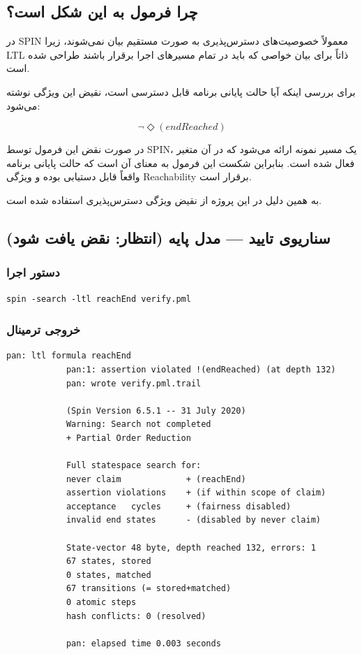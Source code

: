 \documentclass[12pt]{report}
\begin{document}
	\subsection{چرا فرمول به این شکل است؟}
	
	در SPIN معمولاً خصوصیت‌های دسترس‌پذیری به صورت مستقیم بیان نمی‌شوند، زیرا LTL ذاتاً برای بیان خواصی که باید در تمام مسیرهای اجرا برقرار باشند طراحی شده است.
	
	برای بررسی اینکه آیا حالت پایانی برنامه قابل دسترسی است، نقیض این ویژگی نوشته می‌شود:
	
	\[
	\neg\Diamond(\mathit{endReached})
	\]
	
	در صورت نقض این فرمول توسط SPIN، یک مسیر نمونه ارائه می‌شود که در آن متغیر
	فعال شده است. بنابراین شکست این فرمول به معنای آن است که حالت پایانی برنامه واقعاً قابل دستیابی بوده و ویژگی Reachability برقرار است.
	
	به همین دلیل در این پروژه از نقیض ویژگی دسترس‌پذیری استفاده شده است.
	
	\subsection{سناریوی تایید --- مدل پایه (انتظار: نقض یافت شود)}
	
	\subsubsection{دستور اجرا}
	\begin{latin}
		\begin{lstlisting}[style=codestyle]
			spin -search -ltl reachEnd verify.pml
		\end{lstlisting}
	\end{latin}
	
	\subsubsection{خروجی ترمینال}
	\begin{latin}
		\begin{lstlisting}[style=termstyle]
			pan: ltl formula reachEnd
			pan:1: assertion violated !(endReached) (at depth 132)
			pan: wrote verify.pml.trail
			
			(Spin Version 6.5.1 -- 31 July 2020)
			Warning: Search not completed
			+ Partial Order Reduction
			
			Full statespace search for:
			never claim             + (reachEnd)
			assertion violations    + (if within scope of claim)
			acceptance   cycles     + (fairness disabled)
			invalid end states      - (disabled by never claim)
			
			State-vector 48 byte, depth reached 132, errors: 1
			67 states, stored
			0 states, matched
			67 transitions (= stored+matched)
			0 atomic steps
			hash conflicts: 0 (resolved)
			
			pan: elapsed time 0.003 seconds
		\end{lstlisting}
	\end{latin}
	
\end{document}
